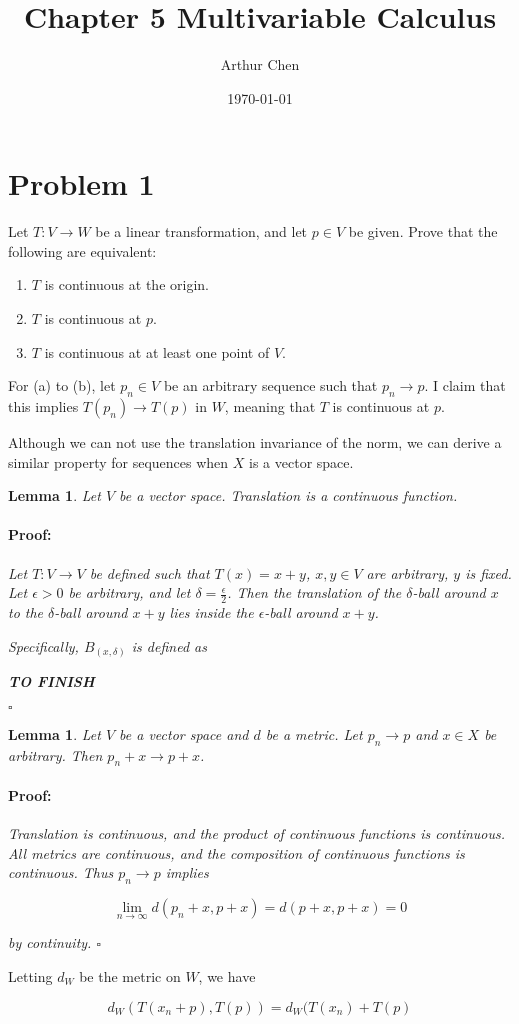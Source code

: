\documentclass{article}
\author{Arthur Chen}
\title{Chapter 5 Multivariable Calculus}
\date{\today}
\newenvironment{proof}{\paragraph{Proof:}}{\hfill$\square$}
\newtheorem{lemma}[theorem]{Lemma}
\begin{document}
\maketitle

\section*{Problem 1}

Let $T: V \rightarrow W$ be a linear transformation, and let $p \in V$ be given. Prove that the following are equivalent:

\begin{enumerate}[label=(\alph*)]
\item $T$ is continuous at the origin.
\item $T$ is continuous at $p$.
\item $T$ is continuous at at least one point of $V$.
\end{enumerate}

For (a) to (b), let $p_n \in V$ be an arbitrary sequence such that $p_n \rightarrow p$. I claim that this implies $T(p_n) \rightarrow T(p)$ in $W$, meaning that $T$ is continuous at $p$.

Although we can not use the translation invariance of the norm, we can derive a similar property for sequences when $X$ is a vector space.

\begin{lemma}
Let $V$ be a vector space. Translation is a continuous function.
\begin{proof}
Let $T: V \rightarrow V$ be defined such that $T(x) = x + y$, $x, y \in V$ are arbitrary, $y$ is fixed. Let $\epsilon > 0$ be arbitrary, and let $\delta = \frac{\epsilon}{2}$. Then the translation of the $\delta$-ball around $x$ to the $\delta$-ball around $x+y$ lies inside the $\epsilon$-ball around $x+y$.

Specifically, $B_(x, \delta)$ is defined as

\textbf{TO FINISH}

\end{proof}
\end{lemma}


\begin{lemma}
Let $V$ be a vector space and $d$ be a metric. Let $p_n \rightarrow p$ and $x \in X$ be arbitrary. Then $p_n + x \rightarrow p+x$.
\begin{proof}
Translation is continuous, and the product of continuous functions is continuous. All metrics are continuous, and the composition of continuous functions is continuous. Thus $p_n \rightarrow p$ implies

\[
\lim_{n \rightarrow \infty} d(p_n + x, p + x) = d(p + x, p + x) = 0
\]

by continuity.
\end{proof}
\end{lemma}

Letting $d_W$ be the metric on $W$, we have

\[
d_W(T(x_n + p), T(p)) = d_W(T(x_n) + T(p)
\]
\end{document}
